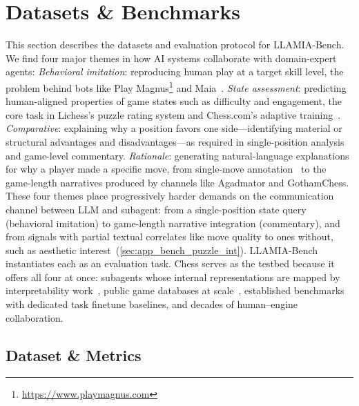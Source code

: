 \section{Datasets \& Benchmarks}
\label{sec:app_bench}

This section describes the datasets and evaluation protocol for LLAMIA-Bench.
We find four major themes in how AI systems collaborate with domain-expert agents:
\emph{Behavioral imitation}: reproducing human play at a target skill level, the problem behind bots like Play Magnus\footnote{\url{https://www.playmagnus.com}} and Maia~\citep{mcilroy2020aligning}.
\emph{State assessment}: predicting human-aligned properties of game states such as difficulty and engagement, the core task in Lichess's puzzle rating system and Chess.com's adaptive training~\citep{lichess2024puzzles}.
\emph{Comparative}: explaining why a position favors one side---identifying material or structural advantages and disadvantages---as required in single-position analysis~\citep{jhamtani-etal-2018-learning} and game-level commentary.
\emph{Rationale}: generating natural-language explanations for why a player made a specific move, from single-move annotation~\citep{jhamtani-etal-2018-learning,zang2019automated} to the game-length narratives produced by channels like Agadmator and GothamChess.
These four themes place progressively harder demands on the communication channel between LLM and subagent: from a single-position state query (behavioral imitation) to game-length narrative integration (commentary), and from signals with partial textual correlates like move quality to ones without, such as aesthetic interest~(\cref{sec:app_bench_puzzle_int}).
LLAMIA-Bench instantiates each as an evaluation task.
Chess serves as the testbed because it offers all four at once: subagents whose internal representations are mapped by interpretability work~\citep{jenner2024evidence}, public game databases at scale~\citep{Lichess,Caissabase}, established benchmarks with dedicated task finetune baselines, and decades of human--engine collaboration.

\subsection{Dataset \& Metrics}
\label{sec:app_bench_dataset}
\label{sec:app_reward}

